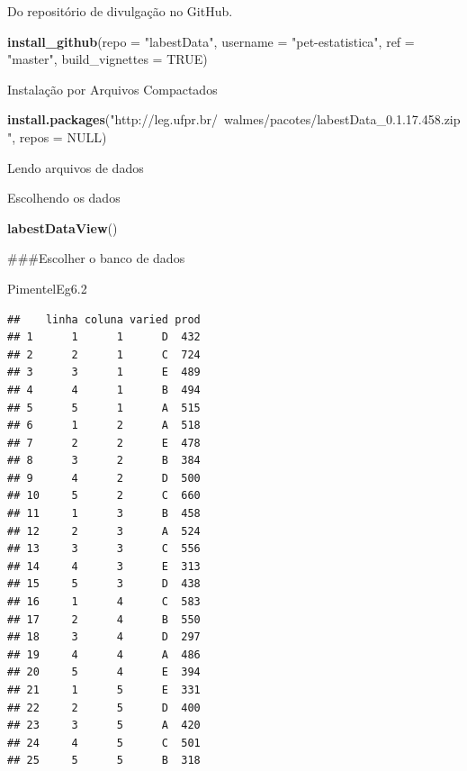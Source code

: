 \documentclass[
]{book}
\newenvironment{Shaded}{\begin{snugshade}}{\end{snugshade}}
\newcommand{\DataTypeTok}[1]{\textcolor[rgb]{0.13,0.29,0.53}{#1}}
\newcommand{\FloatTok}[1]{\textcolor[rgb]{0.00,0.00,0.81}{#1}}
\newcommand{\KeywordTok}[1]{\textcolor[rgb]{0.13,0.29,0.53}{\textbf{#1}}}
\newcommand{\NormalTok}[1]{#1}
\newcommand{\OtherTok}[1]{\textcolor[rgb]{0.56,0.35,0.01}{#1}}
\newcommand{\StringTok}[1]{\textcolor[rgb]{0.31,0.60,0.02}{#1}}
\begin{document}
Do repositório de divulgação no GitHub.

\begin{Shaded}
\begin{Highlighting}[]
\KeywordTok{install_github}\NormalTok{(}\DataTypeTok{repo =} \StringTok{"labestData"}\NormalTok{,}
               \DataTypeTok{username =} \StringTok{"pet-estatistica"}\NormalTok{,}
               \DataTypeTok{ref =} \StringTok{"master"}\NormalTok{, }\DataTypeTok{build_vignettes =} \OtherTok{TRUE}\NormalTok{)}
\end{Highlighting}
\end{Shaded}

Instalação por Arquivos Compactados

\begin{Shaded}
\begin{Highlighting}[]
\KeywordTok{install.packages}\NormalTok{(}\StringTok{"http://leg.ufpr.br/~walmes/pacotes/labestData_0.1.17.458.zip"}\NormalTok{,}
  \DataTypeTok{repos =} \OtherTok{NULL}\NormalTok{)}
\end{Highlighting}
\end{Shaded}

Lendo arquivos de dados

Escolhendo os dados

\begin{Shaded}
\begin{Highlighting}[]
\KeywordTok{labestDataView}\NormalTok{()}
\end{Highlighting}
\end{Shaded}

\#\#\#Escolher o banco de dados

\begin{Shaded}
\begin{Highlighting}[]
\NormalTok{PimentelEg6}\FloatTok{.2}
\end{Highlighting}
\end{Shaded}

\begin{verbatim}
##    linha coluna varied prod
## 1      1      1      D  432
## 2      2      1      C  724
## 3      3      1      E  489
## 4      4      1      B  494
## 5      5      1      A  515
## 6      1      2      A  518
## 7      2      2      E  478
## 8      3      2      B  384
## 9      4      2      D  500
## 10     5      2      C  660
## 11     1      3      B  458
## 12     2      3      A  524
## 13     3      3      C  556
## 14     4      3      E  313
## 15     5      3      D  438
## 16     1      4      C  583
## 17     2      4      B  550
## 18     3      4      D  297
## 19     4      4      A  486
## 20     5      4      E  394
## 21     1      5      E  331
## 22     2      5      D  400
## 23     3      5      A  420
## 24     4      5      C  501
## 25     5      5      B  318
\end{verbatim}
\end{document}
